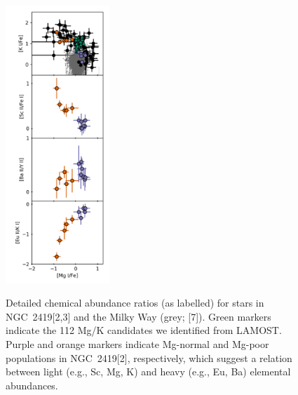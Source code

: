 \documentclass[12pt]{report}
\begin{document}
\setcounter{figure}{1}
\begin{figure}
\begin{center}
	\vspace{-2em}
	\includegraphics[width=0.35\textwidth]{figures/figure2.png}
	\caption{\small{Detailed chemical abundance ratios (as labelled) for stars in NGC~2419[2,3] and the Milky Way (grey; [7]). Green markers indicate the 112 Mg/K candidates we identified  from LAMOST. Purple and orange markers indicate Mg-normal and Mg-poor populations in NGC~2419[2], respectively, which suggest a relation between light (e.g., Sc, Mg, K) and heavy (e.g., Eu, Ba) elemental abundances.}}
	\vspace{-2em}
	\label{fig:mgk}
\end{center}
\end{figure}
\end{document}
